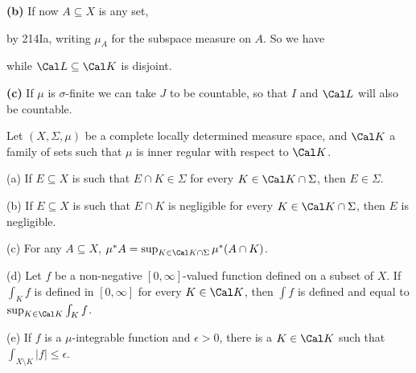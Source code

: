 {{\bf (b)} If now $A\subseteq X$ is any set,


\noindent by 214Ia, writing $\mu_A$ for the subspace measure on $A$.
So we have


\noindent while $\Cal L\subseteq\Cal K$ is disjoint.

\medskip

{\bf (c)} If $\mu$ is $\sigma$-finite we can take $J$ to be countable,
so that $I$ and $\Cal L$ will also be countable.
}%

 Let $(X,\Sigma,\mu)$ be a complete locally
determined measure space, and $\Cal K$ a family of sets such that $\mu$
is inner regular with respect to $\Cal K$.

(a) If $E\subseteq X$ is such that $E\cap K\in\Sigma$ for every
$K\in\Cal K\cap\Sigma$, then $E\in\Sigma$.

(b) If $E\subseteq X$ is such that $E\cap K$ is negligible for every
$K\in\Cal K\cap\Sigma$, then $E$ is negligible.

(c) For any $A\subseteq X$,
$\mu^*A=\sup_{K\in\Cal K\cap\Sigma}\mu^*(A\cap K)$.

(d) Let $f$ be a non-negative $[0,\infty]$-valued function defined on a
subset of $X$.   If $\int_Kf$ is defined in $[0,\infty]$ for every
$K\in\Cal K$, then $\int f$ is defined and equal to
$\sup_{K\in\Cal K}\int_Kf$.

(e) If $f$ is a $\mu$-integrable function and $\epsilon>0$, there is a
$K\in\Cal K$ such that $\int_{X\setminus K}|f|\le\epsilon$.



